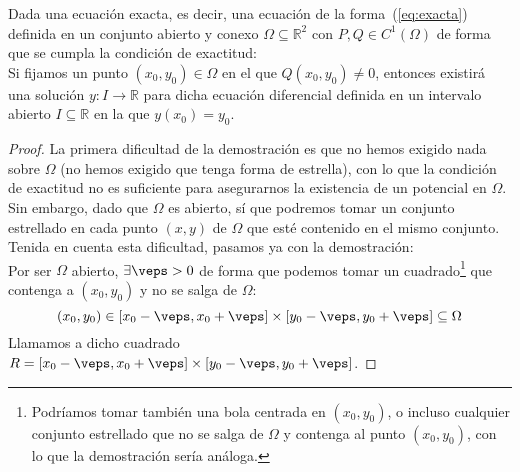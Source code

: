 \begin{prop}\label{prop:resolver_exactas}
    Dada una ecuación exacta, es decir, una ecuación de la forma~(\ref{eq:exacta}) definida en un conjunto abierto y conexo $\Omega\subseteq \mathbb{R}^2$ con $P,Q\in C^1(\Omega)$ de forma que se cumpla la condición de exactitud:\\

    Si fijamos un punto $(x_0,y_0)\in \Omega$ en el que $Q(x_0,y_0)\neq 0$, entonces existirá una solución $y:I\rightarrow\mathbb{R}$ para dicha ecuación diferencial definida en un intervalo abierto $I\subseteq \mathbb{R}$ en la que $y(x_0)=y_0$.
    \begin{proof}
        La primera dificultad de la demostración es que no hemos exigido nada sobre $\Omega$ (no hemos exigido que tenga forma de estrella), con lo que la condición de exactitud no es suficiente para asegurarnos la existencia de un potencial en $\Omega$.\\

        Sin embargo, dado que $\Omega$ es abierto, sí que podremos tomar un conjunto estrellado en cada punto $(x,y)$ de $\Omega$ que esté contenido en el mismo conjunto. Tenida en cuenta esta dificultad, pasamos ya con la demostración:\\

        Por ser $\Omega$ abierto, $\exists \veps > 0$ de forma que podemos tomar un cuadrado\footnote{Podríamos tomar también una bola centrada en $(x_0,y_0)$, o incluso cualquier conjunto estrellado que no se salga de $\Omega$ y contenga al punto $(x_0,y_0)$, con lo que la demostración sería análoga.} que contenga a $(x_0,y_0)$ y no se salga de $\Omega$:
        \begin{equation*}
            (x_0,y_0) \in [x_0-\veps, x_0+\veps] \times [y_0-\veps,y_0+\veps] \subseteq \Omega
        \end{equation*}
        Llamamos a dicho cuadrado $R = [x_0-\veps, x_0+\veps] \times [y_0-\veps,y_0+\veps]$.


\end{proof}
\end{prop}
